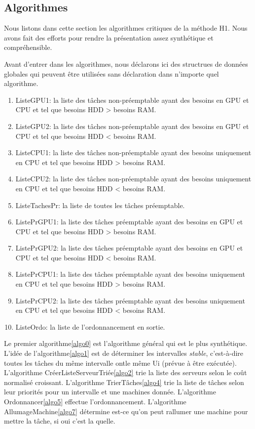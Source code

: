 \subsection{Algorithmes}%
Nous listons dans cette section les algorithmes critiques de la méthode H1. Nous avons fait des efforts pour rendre la présentation assez synthétique et compréhensible.

Avant d'entrer dans les algorithmes, nous déclarons ici des structrues de données globales qui peuvent être utilisées sans déclaration dans n'importe quel algorithme.

\begin{enumerate}
	\item ListeGPU1: la liste des tâches non-préemptable ayant des besoins en GPU et CPU et tel que besoins HDD > besoins RAM.
	\item ListeGPU2: la liste des tâches non-préemptable ayant des besoins en GPU et CPU et tel que besoins HDD < besoins RAM.
	\item ListeCPU1: la liste des tâches non-préemptable ayant des besoins uniquement en CPU et tel que besoins HDD > besoins RAM.
	\item ListeCPU2: la liste des tâches non-préemptable ayant des besoins uniquement en CPU et tel que besoins HDD < besoins RAM.
	\item ListeTachesPr: la liste de toutes les tâches préemptable.
	\item ListePrGPU1: la liste des tâches préemptable ayant des besoins en GPU et CPU et tel que besoins HDD > besoins RAM.
	\item ListePrGPU2: la liste des tâches préemptable ayant des besoins en GPU et CPU et tel que besoins HDD < besoins RAM.
	\item ListePrCPU1: la liste des tâches préemptable ayant des besoins uniquement en CPU et tel que besoins HDD > besoins RAM.
	\item ListePrCPU2: la liste des tâches préemptable ayant des besoins uniquement en CPU et tel que besoins HDD < besoins RAM.
	\item ListeOrdo: la liste de l'ordonnancement en sortie.
\end{enumerate}
\bigskip

Le premier algorithme\ref{algo0} est l'algorithme général qui est le plus synthétique. L'idée de l'algorithme\ref{algo1} est de déterminer les intervalles \textit{stable}, c'est-à-dire toutes les tâches du même intervalle ontle même Ui (prévue à être exécutée).
L'algorithme CréerListeServeurTriée\ref{algo2} trie la liste des serveurs selon le coût normalisé croissant.
L'algorithme TrierTâches\ref{algo4} trie la liste de tâches selon leur priorités pour un intervalle et une machines donnée.
L'algorithme Ordonnancer\ref{algo5} effectue l'ordonnancement. L'algorithme AllumageMachine\ref{algo7} détermine est-ce qu'on peut rallumer une machine pour mettre la tâche, si oui c'est la quelle.

